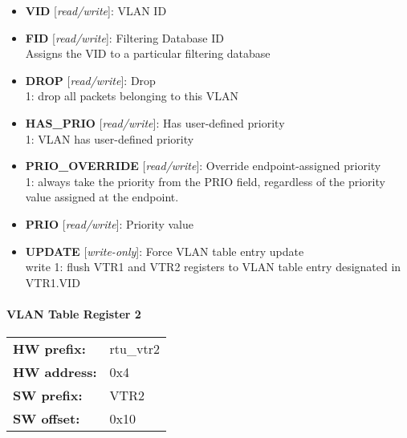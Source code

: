 \begin{itemize}
\item \begin{small}
{\bf 
VID
} [\emph{read/write}]: VLAN ID
\end{small}
\item \begin{small}
{\bf 
FID
} [\emph{read/write}]: Filtering Database ID
\\
Assigns the VID to a particular filtering database
\end{small}
\item \begin{small}
{\bf 
DROP
} [\emph{read/write}]: Drop
\\
1: drop all packets belonging to this VLAN
\end{small}
\item \begin{small}
{\bf 
HAS\_PRIO
} [\emph{read/write}]: Has user-defined priority
\\
1: VLAN has user-defined priority
\end{small}
\item \begin{small}
{\bf 
PRIO\_OVERRIDE
} [\emph{read/write}]: Override endpoint-assigned priority
\\
1: always take the priority from the PRIO field, regardless of the priority value assigned at the endpoint. 
\end{small}
\item \begin{small}
{\bf 
PRIO
} [\emph{read/write}]: Priority value
\end{small}
\item \begin{small}
{\bf 
UPDATE
} [\emph{write-only}]: Force VLAN table entry update
\\
write 1: flush VTR1 and VTR2 registers to VLAN table entry designated in VTR1.VID
\end{small}
\end{itemize}
\paragraph*{VLAN Table Register 2}\vspace{12pt}

\begin{tabular}{l l }
{\bf HW prefix:}  & rtu\_vtr2\\
{\bf HW address:}  & 0x4\\
{\bf SW prefix:}  & VTR2\\
{\bf SW offset:}  & 0x10\\
\end{tabular}


